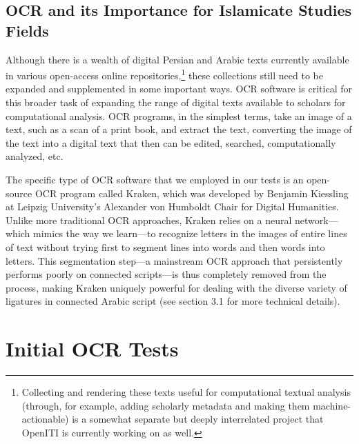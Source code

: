 \subsection{OCR and its Importance for Islamicate Studies Fields}

Although there is a wealth of digital Persian and Arabic texts currently
available in various open-access online repositories,\footnote{Collecting and
rendering these texts useful for computational textual analysis (through, for
example, adding scholarly metadata and making them machine-actionable) is a
somewhat separate but deeply interrelated project that OpenITI is currently
working on as well.} these collections still need to be expanded and
supplemented in some important ways. OCR software is critical for this broader
task of expanding the range of digital texts available to scholars for
computational analysis. OCR programs, in the simplest terms, take an image of a
text, such as a scan of a print book, and extract the text, converting the
image of the text into a digital text that then can be edited, searched,
computationally analyzed, etc.   

The specific type of OCR software that we employed in our tests is an
open-source OCR program called Kraken, which was developed by Benjamin
Kiessling at Leipzig University’s Alexander von Humboldt Chair for Digital
Humanities. Unlike more traditional OCR approaches, Kraken relies on a neural
network—which mimics the way we learn—to recognize letters in the images of
entire lines of text without trying first to segment lines into words and then
words into letters. This segmentation step—a mainstream OCR approach that
persistently performs poorly on connected scripts—is thus completely removed
from the process, making Kraken uniquely powerful for dealing with the diverse
variety of ligatures in connected Arabic script (see section 3.1 for more
technical details).


\section{Initial OCR Tests}
 
